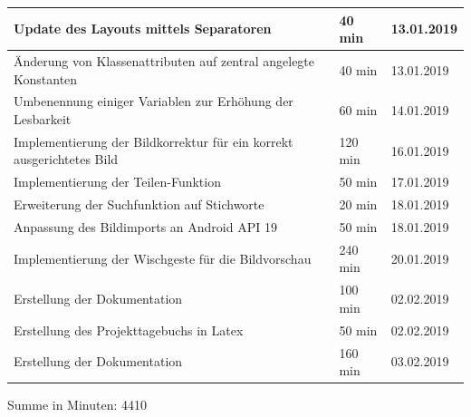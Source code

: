 \begin{longtable}{|p{10cm}|p{2cm}|p{2cm}|}
Update des Layouts mittels Separatoren& 40 min & 13.01.2019 \\ \hline 
Änderung von Klassenattributen auf zentral angelegte Konstanten& 40 min & 13.01.2019 \\ \hline 
Umbenennung einiger Variablen zur Erhöhung der Lesbarkeit& 60 min & 14.01.2019 \\ \hline 
Implementierung der Bildkorrektur für ein korrekt ausgerichtetes Bild& 120 min & 16.01.2019 \\ \hline 
Implementierung der Teilen-Funktion& 50 min & 17.01.2019 \\ \hline 
Erweiterung der Suchfunktion auf Stichworte& 20 min & 18.01.2019 \\ \hline 
Anpassung des Bildimports an Android API 19& 50 min & 18.01.2019 \\ \hline 
Implementierung der Wischgeste für die Bildvorschau& 240 min & 20.01.2019 \\ \hline 
Erstellung der Dokumentation & 100 min & 02.02.2019 \\ \hline
Erstellung des Projekttagebuchs in Latex & 50 min & 02.02.2019 \\ \hline
Erstellung der Dokumentation & 160 min & 03.02.2019 \\ \hline
\end{longtable}
Summe in Minuten: 4410

\newpage

